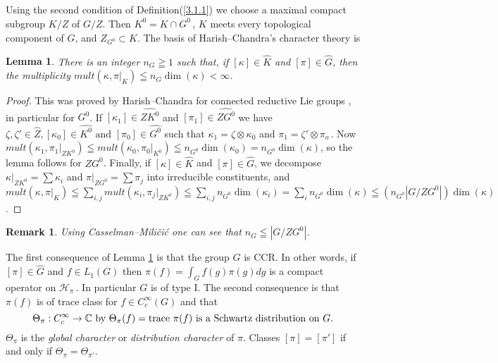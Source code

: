 \documentclass{conm-p-l}
\newtheorem{lemma}[equation]{Lemma}
\newtheorem{remark}[equation]{Remark}
\def\trace{{\rm trace\,\,}}
\def\C{\mathbb{C}}
\def\cH{\mathcal{H}}
\begin{document}
\subsection{}\label{ssec3b}
\setcounter{equation}{0}
Using the second condition of Definition(\ref{3.1.1}) we choose a 
maximal compact subgroup $K/Z$
of $G/Z$.  Then $K^0 = K\cap G^0$\,, $K$ meets every topological component
of $G$, and $Z_{G^0} \subset K$.  The basis of Harish--Chandra's 
character theory is
\begin{lemma}\label{3.2.2} There is an integer $n_G \geqq 1$ such that,
if $[\kappa] \in \widehat{K}$ and $[\pi] \in \widehat{G}$, then the
multiplicity $mult(\kappa,\pi|_K) \leqq n_G\dim(\kappa) < \infty$.
\end{lemma}
\begin{proof}
This was proved by Harish--Chandra for connected reductive Lie groups
\cite{HC1954b}, in particular for $G^0$.  If $[\kappa_1] \in \widehat{ZK^0}$
and $[\pi_1] \in \widehat{ZG^0}$ we have $\zeta, \zeta' \in \widehat{Z},
[\kappa_0] \in \widehat{K^0}\text{ and } [\pi_0] \in \widehat{G^0}$ such
that $\kappa_1 = \zeta\otimes\kappa_0$ and $\pi_1 = \zeta'\otimes\pi_o$\,.
Now $mult(\kappa_1,\pi_1|_{ZK^0}) \leqq mult(\kappa_0,\pi_0|_{K^0})
\leqq n_{G^0}\dim(\kappa_0) = n_{G^0}\dim(\kappa)$, so the lemma follows for
$ZG^0$.  Finally, 
if $[\kappa] \in \widehat{K}$ and $[\pi] \in \widehat{G}$, we decompose
$\kappa|_{ZK^0} = \sum \kappa_i$ and $\pi|_{ZG^0} = \sum \pi_j$ into irreducible
constituents, and $mult(\kappa,\pi|_K) \leqq 
\sum_{i,j} mult(\kappa_i,\pi_j|_{ZK^0}) \leqq \sum_{i,j} n_{G^0}\dim(\kappa_i)
= \sum_i n_{G^0} \dim(\kappa) \leqq (n_{G^0}|G/ZG^0|)\dim(\kappa)$.
\end{proof}
\begin{remark} Using Casselman--Mili\v{c}i\'c \cite{CM1982} one can
see that $n_G \leqq |G/ZG^0|$.
\end{remark}

The first consequence of Lemma \ref{3.2.2} is that the group $G$ is CCR.
In other words, if $[\pi] \in \widehat{G}$ and $f \in L_1(G)$ then
$\pi(f) = \int_Gf(g)\pi(g)dg$ is a compact operator on $\cH_\pi$\,.
In particular $G$ is of type I.  The second consequence is that $\pi(f)$ 
is of trace class for $f \in C_c^\infty(G)$ and that
\begin{equation}\label{3.2.3}
\Theta_\pi: C_c^\infty \to \C \text{ by } \Theta_\pi(f) = \trace \pi(f)
\text{ is a Schwartz distribution on } G.
\end{equation}
$\Theta_\pi$ is the {\em global character} or {\em distribution character}
of $\pi$.  Classes $[\pi] = [\pi']$ if and only if $\Theta_\pi = \Theta_{\pi'}$.
\end{document}
